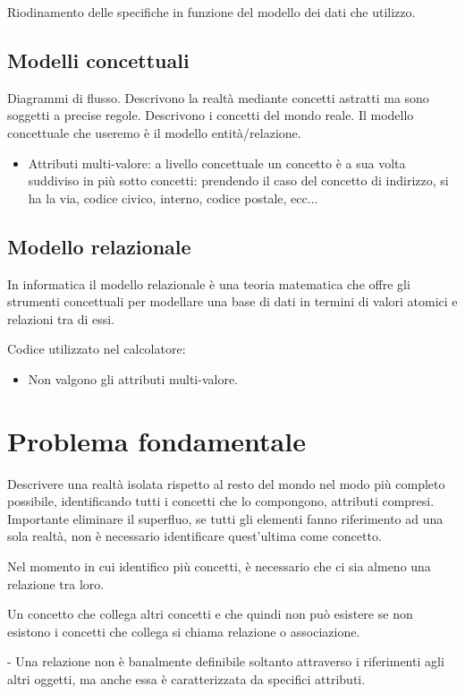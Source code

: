 \documentclass{article}
\begin{document}
Riodinamento delle specifiche in funzione del modello dei dati che utilizzo.

\subsection{Modelli concettuali}
Diagrammi di flusso. Descrivono la realtà mediante concetti astratti ma sono soggetti a precise regole. Descrivono i concetti del mondo reale. Il modello concettuale che useremo è il modello entità/relazione.
\begin{itemize}
  \item Attributi multi-valore: a livello concettuale un concetto è a sua volta suddiviso in più sotto concetti: prendendo il caso del concetto di indirizzo, si ha la via, codice civico, interno, codice postale, ecc...
\end{itemize}

\subsection{Modello relazionale}
In informatica il modello relazionale è una teoria matematica che offre gli strumenti concettuali per modellare una base di dati in termini di valori atomici e relazioni tra di essi.

Codice utilizzato nel calcolatore:
\begin{itemize}
  \item Non valgono gli attributi multi-valore.
\end{itemize}

\section{Problema fondamentale}
Descrivere una realtà isolata rispetto al resto del mondo nel modo più completo possibile, identificando tutti i concetti che lo compongono, attributi compresi. Importante eliminare il superfluo, se tutti gli elementi fanno riferimento ad una sola realtà, non è necessario identificare quest'ultima come concetto.

Nel momento in cui identifico più concetti, è necessario che ci sia almeno una relazione tra loro.

Un concetto che collega altri concetti e che quindi non può esistere se non esistono i concetti che collega si chiama relazione o associazione.

- Una relazione non è banalmente definibile soltanto attraverso i riferimenti agli altri oggetti, ma anche essa è caratterizzata da specifici attributi.
\end{document}
